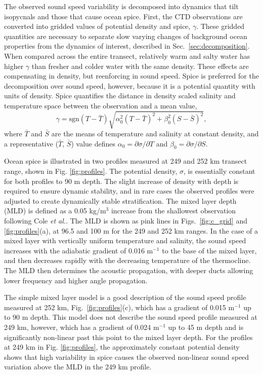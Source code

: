 \documentclass[preprint,NumberedRefs]{JASA}
\begin{document}
The observed sound speed variability is decomposed into dynamics that tilt isopycnals and those that cause ocean spice. First, the CTD observations are converted into gridded values of potential density and spice, $\gamma$. These gridded quantities are necessary to separate slow varying changes of background ocean properties from the dynamics of interest\cite{dzieciuch2004}, described in Sec.~\ref{sec:decomposition}. When compared across the entire transect, relatively warm and salty water has higher $\gamma$ than fresher and colder water with the same density. These effects are compensating in density, but reenforcing in sound speed. Spice is preferred for the decomposition over sound speed, however, because it is a potential quantity with units of density. Spice quantifies the distance in density scaled salinity and temperature space between the observation and a mean value,
\begin{equation}
    \gamma=\textrm{sgn}(T-\bar{T}) \sqrt{\alpha_0^2(T-\bar{T})^2 +\beta_0^2(S-\bar{S})^2},
    \label{eq:gamma}
\end{equation}
where $\bar{T}$ and $\bar{S}$ are the means of temperature and salinity at constant density, and a representative ($\bar{T}$, $\bar{S}$) value defines $\alpha_0=\partial \sigma / \partial T$ and $\beta_0=\partial \sigma / \partial S$.

Ocean spice is illustrated in two profiles measured at 249 and 252 km transect range, shown in Fig. \ref{fig:profiles}. The potential density, $\sigma$, is essentially constant for both profiles to 90 m depth. The slight increase of density with depth is required to ensure dynamic stability, and in rare cases the observed profiles were adjusted to create dynamically stable stratification\citep{barker2017stabilizing}. The mixed layer depth (MLD) is defined as a 0.05 kg/m$^3$ increase from the shallowest observation following Cole \emph{et al.}\cite{cole2010seasonal}. The MLD is shown as pink lines in Figs.~\ref{fig:c_grid} and \ref{fig:profiles}(a), at 96.5 and 100 m for the 249 and 252 km ranges. In the case of a mixed layer with vertically uniform temperature and salinity, the sound speed increases with the adiabatic gradient of 0.016 m$^{-1}$ to the base of the mixed layer, and then decreases rapidly with the decreasing temperature of the thermocline. The MLD then determines the acoustic propagation, with deeper ducts allowing lower frequency and higher angle propagation.

The simple mixed layer model is a good description of the sound speed profile measured at 252 km, Fig.~\ref{fig:profiles}(c), which has a gradient of 0.015 m$^{-1}$ up to 90 m depth. This model does not describe the sound speed profile measured at 249 km, however, which has a gradient of 0.024 m$^{-1}$ up to 45 m depth and is significantly non-linear past this point to the mixed layer depth. For the profiles at 249 km in Fig. \ref{fig:profiles}, the approximately constant potential density shows that high variability in spice causes the observed non-linear sound speed variation above the MLD in the 249 km profile.
\end{document}
